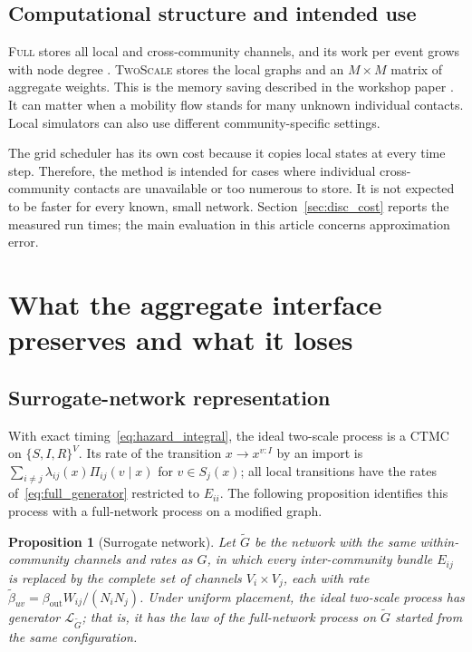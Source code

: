 \documentclass[a4paper,fleqn]{cas-sc}
\newtheorem{proposition}{Proposition}
\newcommand{\Full}{\textup{\textsc{Full}}}
\newcommand{\TS}{\textup{\textsc{TwoScale}}}
\begin{document}
\subsection{Computational structure and intended use}
\label{sec:cost}

\Full{} stores all local and cross-community channels, and its work per event grows with node degree \citep{kuryliak2025simulating}. \TS{} stores the local graphs and an $M\times M$ matrix of aggregate weights. This is the memory saving described in the workshop paper \citep{kuryliak2025towards}. It can matter when a mobility flow stands for many unknown individual contacts. Local simulators can also use different community-specific settings.

The grid scheduler has its own cost because it copies local states at every time step. Therefore, the method is intended for cases where individual cross-community contacts are unavailable or too numerous to store. It is not expected to be faster for every known, small network. Section~\ref{sec:disc_cost} reports the measured run times; the main evaluation in this article concerns approximation error.

\clearpage
\endgroup

\clearpage
\section{What the aggregate interface preserves and what it loses}
\label{sec:analysis}

\subsection{Surrogate-network representation}
\label{sec:surrogate}

With exact timing~\eqref{eq:hazard_integral}, the ideal two-scale process is a CTMC on $\{S,I,R\}^V$. Its rate of the transition $x\to x^{v:I}$ by an import is $\sum_{i\neq j}\lambda_{ij}(x)\Pi_{ij}(v\mid x)$ for $v\in S_j(x)$; all local transitions have the rates of~\eqref{eq:full_generator} restricted to $E_{ii}$. The following proposition identifies this process with a full-network process on a modified graph.

\begin{proposition}[Surrogate network]
\label{prop:surrogate}
Let $\tilde G$ be the network with the same within-community channels and rates as $G$, in which every inter-community bundle $E_{ij}$ is replaced by the complete set of channels $V_i\times V_j$, each with rate $\tilde\beta_{uv}=\beta_{\mathrm{out}}W_{ij}/(N_iN_j)$. Under uniform placement, the ideal two-scale process has generator $\mathcal{L}_{\tilde G}$; that is, it has the law of the full-network process on $\tilde G$ started from the same configuration.
\end{proposition}
\end{document}
